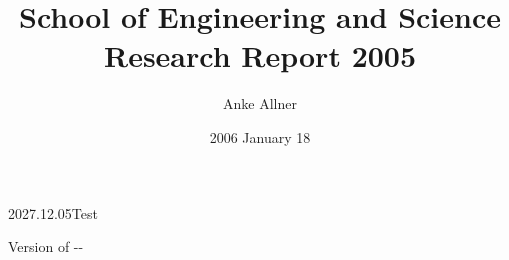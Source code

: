 \documentclass[11pt,a4paper,twoside,twocolumn]{article}
\begin{document}
\def\Hchapter{\paragraph}
\def\bpchem{\BPChem}   %
%
\graphicspath{{./MathTheoPhys/}{./Physics/}{./Nano/}{./LifeSciences/}{./GeoAstro/}{./EECS/}}

\title     {School of Engineering and Science \\
            Research Report 2005} 
\author    {Anke Allner}
\date      {2006 January 18}
   \version
{2}{0}{27.12.05}{Test}

\renewcommand{\refname}{\medbreak Publications\vadjust{\nobreak}}
\renewcommand{\bibname}{\medbreak Publications\vadjust{\nobreak}}


Version of \the\day-\the\month-\the\year
\end{document}

